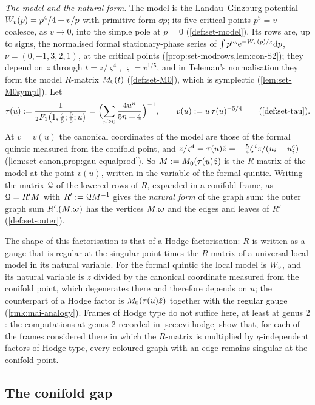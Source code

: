 \emph{The model and the natural form.} The model is the Landau--Ginzburg potential $W_{v}(p)=p^4/4+v/p$ with primitive form $\dd p$; its five critical points $p^5=v$ coalesce, as $v\to0$, into the simple pole at $p=0$ (\cref{def:set-model}). Its rows are, up to signs, the normalised formal stationary-phase series of $\int p^{\nu_b}\mathrm{e}^{-W_{v}(p)/z}\mathrm{d} p$, $\nu=(0,-1,3,2,1)$, at the critical points (\cref{prop:set-modrows,lem:con-S2}); they depend on $z$ through $t=z/\varsigma^4$, $\varsigma=v^{1/5}$, and in Teleman's normalisation they form the model $R$-matrix $M_{0}(t)$ (\cref{def:set-M0}), which is symplectic (\cref{lem:set-M0sympl}). Let
\[
\tau(u):=\frac{1}{{}_2F_1\bigl(1,\frac45;\frac95;u\bigr)}=\Bigl(\sum_{n\geq0}\frac{4u^n}{5n+4}\Bigr)^{-1},\qquad v(u):=u\,\tau(u)^{-5/4}\qquad\text{(\cref{def:set-tau})}.
\]
At $v=v(u)$ the canonical coordinates of the model are those of the formal quintic measured from the conifold point, and $z/\varsigma^4=\tau(u)\hat{z}=-\frac54\zeta^iz/(u_i-u_i^{\mathrm c})$ (\cref{lem:set-canon,prop:gau-equalprod}). So $M:=M_{0}(\tau(u)\hat{z})$ is the $R$-matrix of the model at the point $v(u)$, written in the variable of the formal quintic. Writing the matrix $\mathcal{Q}$ of the lowered rows of $R$, expanded in a conifold frame, as $\mathcal{Q}=R'M$ with $R':=\mathcal{Q} M^{-1}$ gives the \emph{natural form} of the graph sum: the outer graph sum $R'.(M.\boldsymbol{\omega})$ has the vertices $M.\boldsymbol{\omega}$ and the edges and leaves of $R'$ (\cref{def:set-outer}).

The shape of this factorisation is that of a Hodge factorisation: $R$ is written as a gauge that is regular at the singular point times the $R$-matrix of a universal local model in its natural variable. For the formal quintic the local model is $W_{v}$, and its natural variable is $z$ divided by the canonical coordinate measured from the conifold point, which degenerates there and therefore depends on $u$; the counterpart of a Hodge factor is $M_{0}(\tau(u)\hat{z})$ together with the regular gauge (\cref{rmk:mai-analogy}). Frames of Hodge type do not suffice here, at least at genus $2$: the computations at genus $2$ recorded in \cref{sec:evi-hodge} show that, for each of the frames considered there in which the $R$-matrix is multiplied by $q$-independent factors of Hodge type, every coloured graph with an edge remains singular at the conifold point.

\subsection{The conifold gap}
\label{sec:int-gap}

